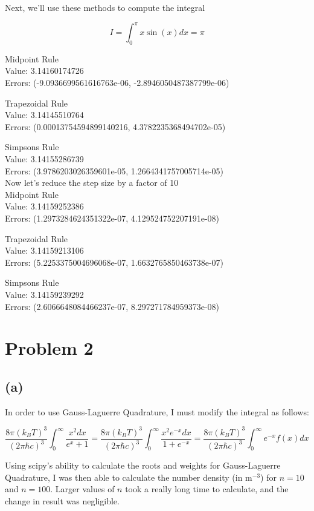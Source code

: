 \documentclass[11pt,letterpaper]{article}
\begin{document}
Next, we'll use these methods to compute the integral

$$ I = \int_0^{\pi} x \sin(x) dx = \pi $$

Midpoint Rule \\
Value: 3.14160174726 \\
Errors: (-9.0936699561616763e-06, -2.8946050487387799e-06)

Trapezoidal Rule \\
Value: 3.14145510764 \\
Errors: (0.00013754594899140216, 4.3782235368494702e-05)

Simpsons Rule \\
Value: 3.14155286739 \\
Errors: (3.9786203026359601e-05, 1.2664341757005714e-05) \\

Now let's reduce the step size by a factor of 10 \\

Midpoint Rule \\
Value: 3.14159252386 \\
Errors: (1.2973284624351322e-07, 4.129524752207191e-08)

Trapezoidal Rule \\
Value: 3.14159213106 \\
Errors: (5.2253375004696068e-07, 1.6632765850463738e-07)

Simpsons Rule \\
Value: 3.14159239292 \\
Errors: (2.6066648084466237e-07, 8.297271784959373e-08)


\section*{Problem 2}

\subsection*{(a)}

In order to use Gauss-Laguerre Quadrature, I must modify the integral as follows:

$$ \frac{8 \pi (k_B T)^3}{(2 \pi \hbar c)^3} \int_0^{\infty} \frac{x^2 dx}{e^x + 1} = \frac{8 \pi (k_B T)^3}{(2 \pi \hbar c)^3} \int_0^{\infty} \frac{x^2 e^{-x} dx}{1 + e^{-x}} = \frac{8 \pi (k_B T)^3}{(2 \pi \hbar c)^3} \int_0^{\infty} e^{-x} f(x) dx $$

Using scipy's ability to calculate the roots and weights for Gauss-Laguerre Quadrature, I was then able to calculate the number density (in m$^{-3}$) for $n=10$ and $n = 100$. Larger values of $n$ took a really long time to calculate, and the change in result was negligible.
\end{document}
